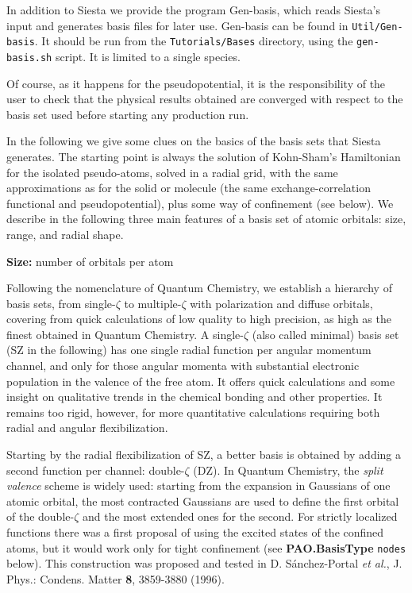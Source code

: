 \documentclass[11pt]{article}
\begin{document}
In addition to {\sc Siesta} we provide the program {\sc
Gen-basis}, which reads {\sc
Siesta}'s input and generates basis files for later use. {\sc
Gen-basis} can be found in {\tt Util/Gen-basis}.
It should be run from the {\tt Tutorials/Bases} directory,
using the {\tt gen-basis.sh} script. It is limited to a single species.

Of course, as it happens for the pseudopotential, it is the
responsibility of the user to check that the physical results obtained
are converged with respect to the basis set used before starting any
production run.

In the following we give some clues on the basics of the basis sets
that {\sc Siesta} generates.
  The starting point is always the solution of Kohn-Sham's Hamiltonian
for the isolated pseudo-atoms, solved in a radial grid,
with the same approximations as for the solid or molecule
(the same exchange-correlation functional and  pseudopotential),
plus some way of confinement (see below).
  We describe in the following three main features of a
basis set of atomic orbitals: size, range, and radial shape.

{\bf Size:} number of orbitals per atom

  Following the nomenclature of Quantum Chemistry, we establish
a hierarchy of basis sets, from single-$\zeta$ to multiple-$\zeta$
with polarization and diffuse orbitals, covering from quick calculations
of low quality to high precision, as high as the finest obtained in
Quantum Chemistry.
  A single-$\zeta$ (also called minimal) basis set (SZ in the following)
has one single radial function per angular momentum channel, and only for
those angular momenta with substantial electronic population in the valence of
the free atom.
  It offers quick calculations and some insight on qualitative trends
in the chemical bonding and other properties.
  It remains too rigid, however, for more quantitative calculations
requiring both radial and angular flexibilization.

  Starting by the radial flexibilization of SZ, a better basis is obtained
by adding a second function per channel: double-$\zeta$ (DZ).
  In Quantum Chemistry, the {\it split valence} scheme
is widely used: starting from the expansion in Gaussians of one atomic
orbital, the most contracted Gaussians are used to define the first
orbital of the double-$\zeta$ and the most extended ones for the second.
  For strictly localized functions there was a first proposal
of using the excited states of the confined atoms, but it would work only
for tight confinement (see {\bf PAO.BasisType} {\tt nodes} below).
  This construction was proposed and tested in D. S\'anchez-Portal
{\it et al.}, J. Phys.: Condens. Matter {\bf 8}, 3859-3880 (1996).
\end{document}
